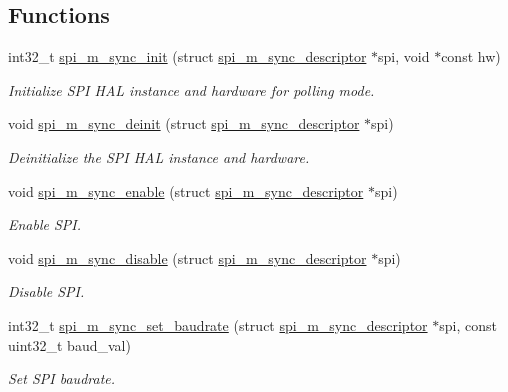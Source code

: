 \subsection*{Functions}
\begin{DoxyCompactItemize}
\item 
int32\+\_\+t \hyperlink{group__doc__driver__hal__spi__master__sync_ga3f0a5220385e86a704bdbb89623cf3d3}{spi\+\_\+m\+\_\+sync\+\_\+init} (struct \hyperlink{structspi__m__sync__descriptor}{spi\+\_\+m\+\_\+sync\+\_\+descriptor} $\ast$spi, void $\ast$const hw)
\begin{DoxyCompactList}\small\item\em Initialize S\+PI H\+AL instance and hardware for polling mode. \end{DoxyCompactList}\item 
void \hyperlink{group__doc__driver__hal__spi__master__sync_ga9cf25d877d82e3e1f572643d579af447}{spi\+\_\+m\+\_\+sync\+\_\+deinit} (struct \hyperlink{structspi__m__sync__descriptor}{spi\+\_\+m\+\_\+sync\+\_\+descriptor} $\ast$spi)
\begin{DoxyCompactList}\small\item\em Deinitialize the S\+PI H\+AL instance and hardware. \end{DoxyCompactList}\item 
void \hyperlink{group__doc__driver__hal__spi__master__sync_ga2dd2e3fba4c359e43a7b319519c3c5a0}{spi\+\_\+m\+\_\+sync\+\_\+enable} (struct \hyperlink{structspi__m__sync__descriptor}{spi\+\_\+m\+\_\+sync\+\_\+descriptor} $\ast$spi)
\begin{DoxyCompactList}\small\item\em Enable S\+PI. \end{DoxyCompactList}\item 
void \hyperlink{group__doc__driver__hal__spi__master__sync_ga9ded81d6be782e2f51bd54d254de5e67}{spi\+\_\+m\+\_\+sync\+\_\+disable} (struct \hyperlink{structspi__m__sync__descriptor}{spi\+\_\+m\+\_\+sync\+\_\+descriptor} $\ast$spi)
\begin{DoxyCompactList}\small\item\em Disable S\+PI. \end{DoxyCompactList}\item 
int32\+\_\+t \hyperlink{group__doc__driver__hal__spi__master__sync_ga4c0ec93b64162e9a26ef8783cebe015a}{spi\+\_\+m\+\_\+sync\+\_\+set\+\_\+baudrate} (struct \hyperlink{structspi__m__sync__descriptor}{spi\+\_\+m\+\_\+sync\+\_\+descriptor} $\ast$spi, const uint32\+\_\+t baud\+\_\+val)
\begin{DoxyCompactList}\small\item\em Set S\+PI baudrate. \end{DoxyCompactList}\item 

\end{DoxyCompactItemize}
